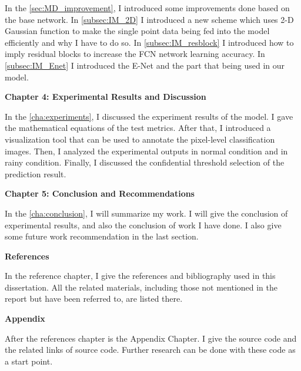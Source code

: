 \begin{spacing}{1.5}
In the \autoref{sec:MD_improvement}, I introduced some improvements done based on the base network. In \autoref{subsec:IM_2D} I introduced a new scheme which uses 2-D Gaussian function to make the single point data being fed into the model efficiently and why I have to do so. In \autoref{subsec:IM_resblock} I  introduced how to imply residual blocks to increase the FCN network learning accuracy. In \autoref{subsec:IM_Enet} I introduced the E-Net and the part that being used in our model.

{\large\textbf{Chapter 4: Experimental Results and Discussion}}

In the \autoref{cha:experiments}, I discussed the experiment results of the model. I gave the mathematical equations of the test metrics. After that, I introduced a visualization tool that can be used to annotate the pixel-level classification images. Then, I analyzed the experimental outputs in normal condition and in rainy condition. Finally, I discussed the confidential threshold selection of the prediction result.

{\large\textbf{Chapter 5: Conclusion and Recommendations}}

In the \autoref{cha:conclusion}, I will summarize my work. I will give the conclusion of experimental results, and also the conclusion of work I have done. I also give some future work recommendation in the last section.

{\large\textbf{References}}

In the reference chapter, I give the references and bibliography used in this dissertation. All the related materials, including those not mentioned in the report but have been referred to, are listed there.

{\large\textbf{Appendix}}

After the references chapter is the Appendix Chapter. I give the source code and the related links of source code. Further research can be done with these code as a start point.

\end{spacing}
\newpage


